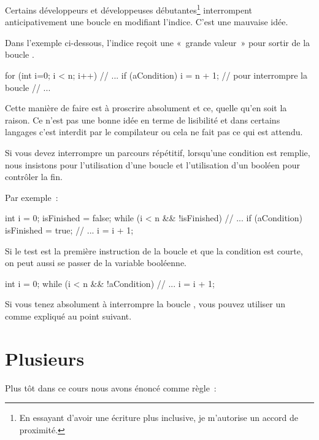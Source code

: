 	Certains développeurs et développeuses débutantes\footnote{En essayant
	d'avoir une écriture plus inclusive, je m'autorise un accord de proximité.}
	interrompent anticipativement une boucle  en modifiant l'indice.
	C'est une mauvaise idée. 

	Dans l'exemple ci-dessous, l'indice  reçoit une «~grande valeur~» pour
	sortir de la boucle .
	
	\begin{java}
for (int i=0; i < n; i++){
	// ...
	if (aCondition) {
		i = n + 1;		// pour interrompre la boucle
	}
	// ...
}
	\end{java}

	Cette manière de faire est à proscrire absolument et ce, quelle qu’en soit
	la raison.  Ce n’est pas une bonne idée en terme de lisibilité et dans
	certains langages c’est interdit par le compilateur ou cela ne fait pas ce
	qui est attendu.
	
	Si vous devez interrompre un parcours répétitif, lorsqu'une condition est
	remplie, nous insistons pour l'utilisation d'une boucle
	\pc{\algorithmicwhile} et l’utilisation d’un booléen pour contrôler la fin.
	
	Par exemple~:

	\begin{java}
int i = 0;
isFinished = false;
while (i < n && !isFinished){
	// ...
	if (aCondition){
		isFinished = true;
	}
	// ...
	i = i + 1;
}
	\end{java}
		
	\bigskip
	Si le test est la première instruction de la boucle
	et que la condition est courte,
	on peut aussi se passer de la variable booléenne.

	\begin{java}
int i = 0;
while (i < n && !aCondition){
	// ...
	i = i + 1;
}
	\end{java}
		
	\medskip
	Si vous tenez absolument à interrompre la boucle \pc{\algorithmicfor},
	vous pouvez utiliser un  comme expliqué au point suivant.
	 
\section{Plusieurs }

	Plus tôt dans ce cours nous avons énoncé comme règle~:

